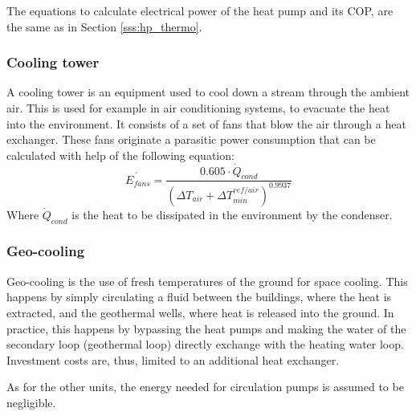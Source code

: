 \documentclass{article}
\begin{document}
The equations to calculate electrical power of the heat pump and its COP, are the same as in Section \ref{sss:hp_thermo}.

\subsubsection{Cooling tower}\label{sss:cooling_tower}
A cooling tower is an equipment used to cool down a stream through the ambient air. This is used for example in air conditioning systems, to evacuate the heat into the environment. It consists of a set of fans that blow the air through a heat exchanger. These fans originate a parasitic power consumption that can be calculated with help of the following equation\cite{henchozPotentialRefrigerantBased}:
\begin{equation}
\dot{E_{fans}} = \frac{0.605 \cdot \dot{Q}_{cond}}{( \Delta T_{air} + \Delta T_{min}^{ref/air})^{0.9937}}
\end{equation}
Where $\dot{Q}_{cond}$ is the heat to be dissipated in the environment by the condenser. 


\subsubsection{Geo-cooling}
Geo-cooling is the use of fresh temperatures of the ground for space cooling. This happens by simply circulating a fluid between the buildings, where the heat is extracted, and the geothermal wells, where heat is released into the ground. In practice, this happens by bypassing the heat pumps and making the water of the secondary loop (geothermal loop) directly exchange with the heating water loop. Investment costs are, thus, limited to an additional heat exchanger. 

As for the other units, the energy needed for circulation pumps is assumed to be negligible. 
\end{document}
